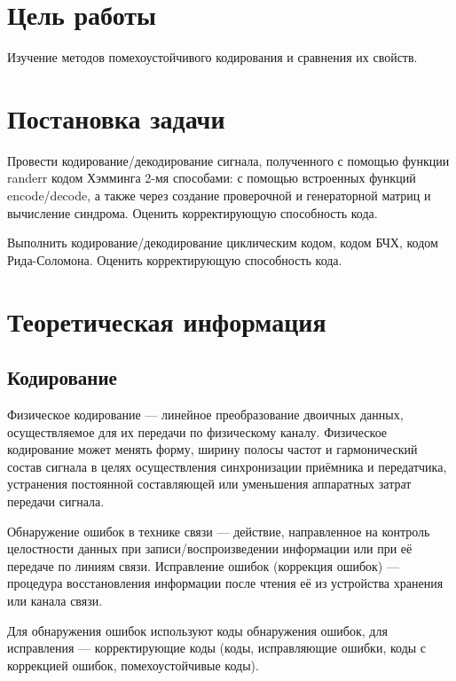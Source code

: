 









\section{Цель работы}
Изучение методов помехоустойчивого кодирования и сравнения их свойств.
 
\section{Постановка задачи}
Провести кодирование/декодирование сигнала, полученного с помощью функции randerr кодом Хэмминга 2-мя способами: с помощью встроенных функций encode/decode, а также через создание проверочной и генераторной матриц и вычисление синдрома. Оценить корректирующую способность кода.

Выполнить кодирование/декодирование циклическим кодом, кодом БЧХ, кодом Рида-Соломона. Оценить корректирующую способность кода.

 
\section{Теоретическая информация}

\subsection{Кодирование}
Физическое кодирование — линейное преобразование двоичных данных, осуществляемое для их передачи по физическому каналу. Физическое кодирование может менять форму, ширину полосы частот и гармонический состав сигнала в целях осуществления синхронизации приёмника и передатчика, устранения постоянной составляющей или уменьшения аппаратных затрат передачи сигнала.

Обнаружение ошибок в технике связи — действие, направленное на контроль целостности данных при записи/воспроизведении информации или при её передаче по линиям связи. Исправление ошибок (коррекция ошибок) — процедура восстановления информации после чтения её из устройства хранения или канала связи.

Для обнаружения ошибок используют коды обнаружения ошибок, для исправления — корректирующие коды (коды, исправляющие ошибки, коды с коррекцией ошибок, помехоустойчивые коды).


